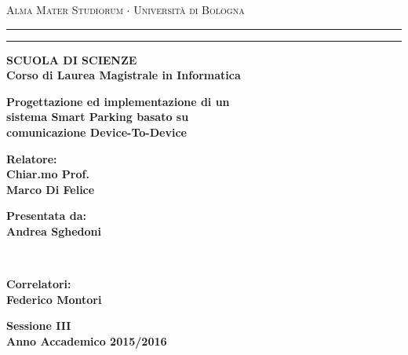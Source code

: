 \documentclass[12pt,a4paper]{report}
\begin{document}
\begin{titlepage}
\begin{center}
{{\Large{\textsc{Alma Mater Studiorum $\cdot$ Universit\`a di
Bologna}}}} \rule[0.1cm]{15.8cm}{0.1mm}
\rule[0.5cm]{15.8cm}{0.6mm}
{\small{\bf SCUOLA DI SCIENZE\\
Corso di Laurea Magistrale in Informatica}}
\end{center}
\vspace{15mm}
\begin{center}
{\LARGE{\bf Progettazione ed implementazione di un}}\\
\vspace{3mm}
{\LARGE{\bf sistema Smart Parking basato su}}\\
\vspace{3mm}
{\LARGE{\bf comunicazione Device-To-Device}}\\
\end{center}
\vspace{40mm}
\par
\noindent
\begin{minipage}[t]{0.47\textwidth}
{\large{\bf Relatore:\\
Chiar.mo Prof.\\
Marco Di Felice}}
\end{minipage}
\hfill
\begin{minipage}[t]{0.47\textwidth}\raggedleft
{\large{\bf Presentata da:\\
Andrea Sghedoni}}
\end{minipage}
\vspace{10mm}
\\\begin{minipage}[t]{0.47\textwidth}
{\large{\bf Correlatori:\\
Federico Montori}}
\end{minipage}
\vspace{13mm}
\begin{center}
{\large{\bf Sessione III\\
Anno Accademico 2015/2016}}
\end{center}
\end{titlepage}
\end{document}
